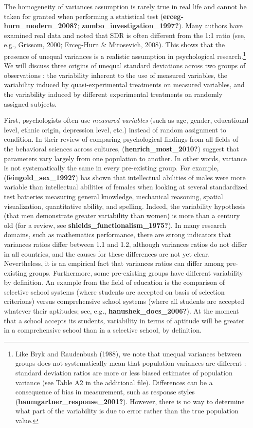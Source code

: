 \documentclass[
  english,
  man]{apa6}
\begin{document}
The homogeneity of variances assumption is rarely true in real life and cannot be taken for granted when performing a statistical test (\textbf{erceg-hurn\_modern\_2008?}; \textbf{zumbo\_investigation\_1997?}). Many authors have examined real data and noted that SDR is often different from the 1:1 ratio (see, e.g., Grissom, 2000; Erceg-Hurn \(\&\) Mirosevich, 2008). This shows that the presence of unequal variances is a realistic assumption in psychological research.\footnote{Like Bryk and Raudenbush (1988), we note that unequal variances between groups does not systematically mean that population variances are different : standard deviation ratios are more or less biased estimates of population variance (see Table A2 in the additional file). Differences can be a consequence of bias in measurement, such as response styles (\textbf{baumgartner\_response\_2001?}). However, there is no way to determine what part of the variability is due to error rather than the true population value.} We will discuss three origins of unequal standard deviations across two groups of observations : the variability inherent to the use of measured variables, the variability induced by quasi-experimental treatments on measured variables, and the variability induced by different experimental treatments on randomly assigned subjects.

First, psychologists often use \emph{measured variables} (such as age, gender, educational level, ethnic origin, depression level, etc.) instead of random assignment to condition. In their review of comparing psychological findings from all fields of the behavioral sciences across cultures, (\textbf{henrich\_most\_2010?}) suggest that parameters vary largely from one population to another. In other words, variance is not systematically the same in every pre-existing group. For example, (\textbf{feingold\_sex\_1992?}) has shown that intellectual abilities of males were more variable than intellectual abilities of females when looking at several standardized test batteries measuring general knowledge, mechanical reasoning, spatial visualization, quantitative ability, and spelling. Indeed, the variability hypothesis (that men demonstrate greater variability than women) is more than a century old (for a review, see \textbf{shields\_functionalism\_1975?}). In many research domains, such as mathematics performance, there are strong indicators that variances ratios differ between 1.1 and 1.2, although variances ratios do not differ in all countries, and the causes for these differences are not yet clear. Nevertheless, it is an empirical fact that variances ratios can differ among pre-existing groups. Furthermore, some pre-existing groups have different variability by definition. An example from the field of education is the comparison of selective school systems (where students are accepted on basis of selection criterions) versus comprehensive school systems (where all students are accepted whatever their aptitudes; see, e.g., \textbf{hanushek\_does\_2006?}). At the moment that a school accepts its students, variability in terms of aptitude will be greater in a comprehensive school than in a selective school, by definition.
\end{document}
